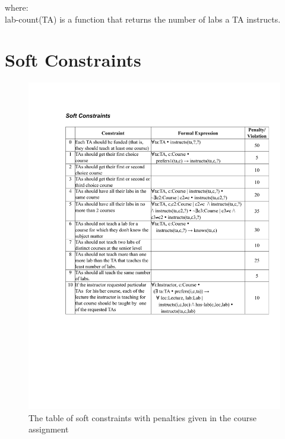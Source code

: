 \documentclass{article}
\begin{document}
\begin{appendices}
\begin{enumerate}
    where:\\ lab-count(TA) is a function that returns the number of labs
    a TA instructs.\\

  \end{enumerate}
  
  \section{Soft Constraints}
  \begin{figure}
  \includegraphics[scale=0.5]{softConstraints}
  \caption{\label{soft}The table of soft constraints with penalties given in the course assignment}
  \end{figure}
  

\end{appendices}
\end{document}
